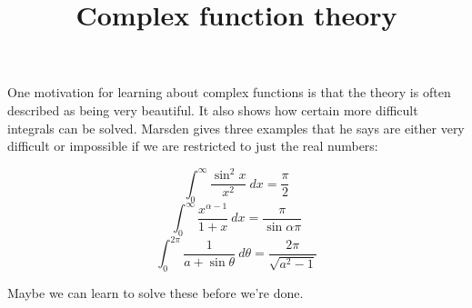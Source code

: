 \documentclass[11pt, oneside]{article}   	%
\title{Complex function theory}
\date{}							%
\begin{document}
\maketitle
\Large
One motivation for learning about complex functions is that the theory is often described as being very beautiful.  It also shows how certain more difficult integrals can be solved. Marsden gives three examples that he says are either very difficult or impossible if we are restricted to just the real numbers:

\[ \int_0^{\infty} \frac{\sin^2 x}{x^2} \ dx = \frac{\pi}{2} \]
\[ \int_0^{\infty} \frac{x^{\alpha - 1}}{1 + x} \ dx = \frac{\pi}{\sin \alpha \pi} \]
\[ \int_0^{2 \pi} \frac{1}{a + \sin \theta} \ d \theta = \frac{2 \pi}{\sqrt{a^2 - 1}} \]

Maybe we can learn to solve these before we're done.
\end{document}
